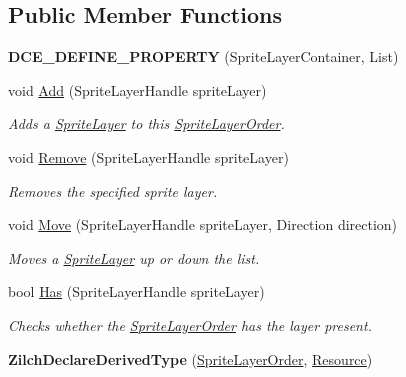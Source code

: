 \subsection*{Public Member Functions}
\begin{DoxyCompactItemize}
\item 
\hypertarget{classDCEngine_1_1SpriteLayerOrder_a895148aa7b6b1b1714010306e69185ca}{{\bfseries D\-C\-E\-\_\-\-D\-E\-F\-I\-N\-E\-\_\-\-P\-R\-O\-P\-E\-R\-T\-Y} (Sprite\-Layer\-Container, List)}\label{classDCEngine_1_1SpriteLayerOrder_a895148aa7b6b1b1714010306e69185ca}

\item 
void \hyperlink{classDCEngine_1_1SpriteLayerOrder_ac5dfeb5690b6ee4c523258b30881f5dc}{Add} (Sprite\-Layer\-Handle sprite\-Layer)
\begin{DoxyCompactList}\small\item\em Adds a \hyperlink{classDCEngine_1_1SpriteLayer}{Sprite\-Layer} to this \hyperlink{classDCEngine_1_1SpriteLayerOrder}{Sprite\-Layer\-Order}. \end{DoxyCompactList}\item 
void \hyperlink{classDCEngine_1_1SpriteLayerOrder_a570d9fc201765b86d28a47397d39f2f5}{Remove} (Sprite\-Layer\-Handle sprite\-Layer)
\begin{DoxyCompactList}\small\item\em Removes the specified sprite layer. \end{DoxyCompactList}\item 
\hypertarget{classDCEngine_1_1SpriteLayerOrder_ac8c6082cdc929fe814fded85f0fb3601}{void \hyperlink{classDCEngine_1_1SpriteLayerOrder_ac8c6082cdc929fe814fded85f0fb3601}{Move} (Sprite\-Layer\-Handle sprite\-Layer, Direction direction)}\label{classDCEngine_1_1SpriteLayerOrder_ac8c6082cdc929fe814fded85f0fb3601}

\begin{DoxyCompactList}\small\item\em Moves a \hyperlink{classDCEngine_1_1SpriteLayer}{Sprite\-Layer} up or down the list. \end{DoxyCompactList}\item 
bool \hyperlink{classDCEngine_1_1SpriteLayerOrder_a7914fe7eeeab33db420577b4c68d5b8a}{Has} (Sprite\-Layer\-Handle sprite\-Layer)
\begin{DoxyCompactList}\small\item\em Checks whether the \hyperlink{classDCEngine_1_1SpriteLayerOrder}{Sprite\-Layer\-Order} has the layer present. \end{DoxyCompactList}\item 
\hypertarget{classDCEngine_1_1SpriteLayerOrder_af6e46f59287a56e66c0590a268823c10}{{\bfseries Zilch\-Declare\-Derived\-Type} (\hyperlink{classDCEngine_1_1SpriteLayerOrder}{Sprite\-Layer\-Order}, \hyperlink{classDCEngine_1_1Resource}{Resource})}\label{classDCEngine_1_1SpriteLayerOrder_af6e46f59287a56e66c0590a268823c10}


\end{DoxyCompactItemize}
